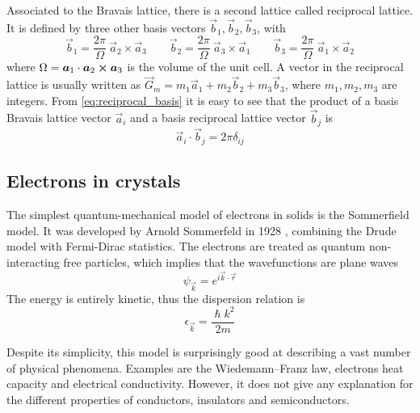Associated to the Bravais lattice, there is a second lattice called reciprocal lattice. It is defined by three other basis vectors $\vec{b}_1, \vec{b}_2, \vec{b}_3$, with
\begin{equation} \label{eq:reciprocal_basis}
    \vec{b}_1 = \frac{2\pi}{\Omega} \ \vec{a}_2 \times \vec{a}_3
    \qquad
    \vec{b}_2 = \frac{2\pi}{\Omega} \ \vec{a}_3 \times \vec{a}_1
    \qquad
    \vec{b}_3 = \frac{2\pi}{\Omega} \ \vec{a}_1 \times \vec{a}_2
\end{equation}
where $\Omega = \mathbf{\boldsymbol{a}}_1 \cdot \mathbf{\boldsymbol{a}}_2 \cross \mathbf{\boldsymbol{a}}_3$ is the volume of the unit cell. A vector in the reciprocal lattice is usually written as $\vec{G}_m = m_1\vec{a}_1 + m_2\vec{b}_2 + m_3\vec{b}_3$, where $m_1, m_2, m_3$ are integers. From \cref{eq:reciprocal_basis} it is easy to see that the product of a basis Bravais lattice vector $\vec{a}_i$ and a basis reciprocal lattice vector $\vec{b}_j$ is
\begin{equation}
    \vec{a}_i \cdot \vec{b}_j = 2\pi \delta_{ij}
\end{equation}

\subsection{Electrons in crystals} \label{sec:electrons}
The simplest quantum-mechanical model of electrons in solids is the Sommerfield model. It was developed by Arnold Sommerfeld in 1928 \cite{sommerfeldZurElektronentheorieMetalle1928}, combining the Drude model \cite{drude1900a} with Fermi-Dirac statistics. The electrons are treated as quantum non-interacting free particles, which implies that the wavefunctions are plane waves
\begin{equation} \label{eq:plane_wave}
    \psi_\vec{k} = e^{i\vec{k}\cdot\vec{r}}
\end{equation}
The energy is entirely kinetic, thus the dispersion relation is
\begin{equation} \label{eq:free_dispersion}
    \epsilon_\vec{k} = \frac{\hslash k^2}{2m}
\end{equation}

Despite its simplicity, this model is surprisingly good at describing a vast number of physical phenomena. Examples are the Wiedemann–Franz law, electrons heat capacity and electrical conductivity. However, it does not give any explanation for the different properties of conductors, insulators and semiconductors.

